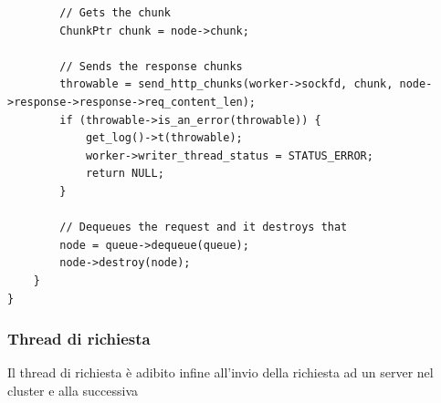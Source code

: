 \documentclass[italian]{tktltiki2}
\begin{document}
\begin{lstlisting}
        // Gets the chunk
        ChunkPtr chunk = node->chunk;

        // Sends the response chunks
        throwable = send_http_chunks(worker->sockfd, chunk, node->response->response->req_content_len);
        if (throwable->is_an_error(throwable)) {
            get_log()->t(throwable);
            worker->writer_thread_status = STATUS_ERROR;
            return NULL;
        }

        // Dequeues the request and it destroys that
        node = queue->dequeue(queue);
        node->destroy(node);
    }
}
\end{lstlisting}

\subsubsection{Thread di richiesta}
\label{sec:request}
Il thread di richiesta è adibito infine all'invio della richiesta ad un server nel cluster e alla successiva 
\end{document}
